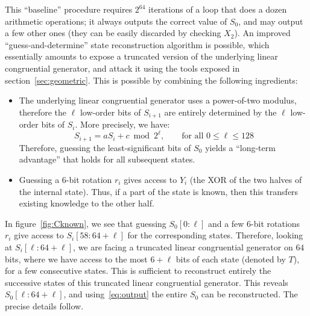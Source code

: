 \documentclass[submission,svgnames,journal=tosc]{iacrtrans}
\begin{document}
This ``baseline'' procedure requires $2^{64}$ iterations of a loop that does a
dozen arithmetic operations; it always outputs the correct value of $S_0$, and
may output a few other ones (they can be easily discarded by checking $X_2$). An
improved ``guess-and-determine'' state reconstruction algorithm is possible,
which essentially amounts to expose a truncated version of the underlying linear
congruential generator, and attack it using the tools exposed in
section~\ref{sec:geometric}. This is possible by combining the following
ingredients:
\begin{itemize}
\item The underlying linear congruential generator uses a power-of-two modulus,
  therefore the $\ell$ low-order bits of $S_{i+1}$ are entirely determined by
  the $\ell$ low-order bits of $S_i$. More precisely, we have:
  \begin{equation}\label{eq:lcg}
    S_{i+1} = aS_i + c \bmod 2^\ell, \qquad \text{for all } 0 \leq \ell \leq 128
  \end{equation}
  Therefore, guessing the least-significant bits of $S_0$ yields a ``long-term
  advantage'' that holds for all subsequent states.

\item Guessing a 6-bit rotation $r_i$ gives access to $Y_i$ (the XOR of the two
  halves of the internal state). Thus, if a part of the state is known, then
  this transfers existing knowledge to the other half.
\end{itemize}

In figure~\ref{fig:Cknown}, we see that guessing $S_0[0:\ell]$ and a few 6-bit
rotations $r_i$ give access to $S_i[58:64+\ell]$ for the corresponding
states. Therefore, looking at $S_i[\ell:64+\ell]$, we are facing a truncated
linear congruential generator on $64$ bits, where we have access to the most
$6+\ell$ bits of each state (denoted by $T$), for a few consecutive states. This
is sufficient to reconstruct entirely the successive states of this truncated
linear congruential generator. This reveals $S_0[\ell:64+\ell]$, and
using~\eqref{eq:output} the entire $S_0$ can be reconstructed. The precise
details follow.
\end{document}
